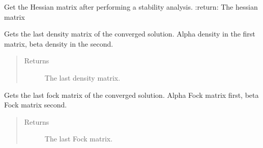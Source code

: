\documentclass[letterpaper,10pt,english]{sphinxmanual}
\begin{document}
\begin{fulllineitems}
\begin{fulllineitems}
\begin{quote}
\begin{description}
\end{description}\end{quote}

\end{fulllineitems}


\begin{fulllineitems}
\label{\detokenize{UHF:ghf.UHF.UHF.get_hessian}}
Get the Hessian matrix after performing a stability analysis.
:return: The hessian matrix

\end{fulllineitems}


\begin{fulllineitems}
\label{\detokenize{UHF:ghf.UHF.UHF.get_last_dens}}
Gets the last density matrix of the converged solution.
Alpha density in the first matrix, beta density in the second.
\begin{quote}\begin{description}
\item[{Returns}] \leavevmode
The last density matrix.

\end{description}\end{quote}

\end{fulllineitems}


\begin{fulllineitems}
\label{\detokenize{UHF:ghf.UHF.UHF.get_last_fock}}
Gets the last fock matrix of the converged solution.
Alpha Fock matrix first, beta Fock matrix second.
\begin{quote}\begin{description}
\item[{Returns}] \leavevmode
The last Fock matrix.

\end{description}\end{quote}


\end{fulllineitems}
\end{fulllineitems}
\end{document}
